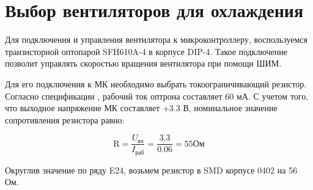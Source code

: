 \section {Выбор вентиляторов для охлаждения}

Для подключения и управления вентилятора к микроконтроллеру, воспользуемся транзисторной оптопарой SFH610A-4 в корпусе DIP-4. Такое подключение позволит управлять скоростью вращения вентилятора при помощи ШИМ.

Для его подключения к МК необходимо выбрать токоограничивающий резистор. Согласно спецификации \cite{}, рабочий ток оптрона составляет 60 мА. С учетом того, что выходное напряжение МК составляет +3.3 В, номинальное значение сопротивления резистора равно:

$$
\text{R} = \frac{U_{вх}}{I_{раб}} = \frac{3.3}{0.06} = 55 Ом
$$

Округлив значение по ряду E24, возьмем резистор в SMD корпусе 0402 на 56 Ом.